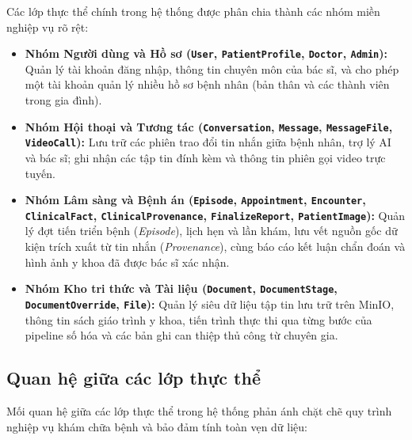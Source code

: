 Các lớp thực thể chính trong hệ thống được phân chia thành các nhóm miền nghiệp vụ rõ rệt:
\begin{itemize}
  \item \textbf{Nhóm Người dùng và Hồ sơ (\texttt{User}, \texttt{PatientProfile}, \texttt{Doctor}, \texttt{Admin}):} Quản lý tài khoản đăng nhập, thông tin chuyên môn của bác sĩ, và cho phép một tài khoản quản lý nhiều hồ sơ bệnh nhân (bản thân và các thành viên trong gia đình).
  \item \textbf{Nhóm Hội thoại và Tương tác (\texttt{Conversation}, \texttt{Message}, \texttt{MessageFile}, \texttt{VideoCall}):} Lưu trữ các phiên trao đổi tin nhắn giữa bệnh nhân, trợ lý AI và bác sĩ; ghi nhận các tập tin đính kèm và thông tin phiên gọi video trực tuyến.
  \item \textbf{Nhóm Lâm sàng và Bệnh án (\texttt{Episode}, \texttt{Appointment}, \texttt{Encounter}, \texttt{ClinicalFact}, \texttt{ClinicalProvenance}, \texttt{FinalizeReport}, \texttt{PatientImage}):} Quản lý đợt tiến triển bệnh (\textit{Episode}), lịch hẹn và lần khám, lưu vết nguồn gốc dữ kiện trích xuất từ tin nhắn (\textit{Provenance}), cùng báo cáo kết luận chẩn đoán và hình ảnh y khoa đã được bác sĩ xác nhận.
  \item \textbf{Nhóm Kho tri thức và Tài liệu (\texttt{Document}, \texttt{DocumentStage}, \texttt{DocumentOverride}, \texttt{File}):} Quản lý siêu dữ liệu tập tin lưu trữ trên MinIO, thông tin sách giáo trình y khoa, tiến trình thực thi qua từng bước của pipeline số hóa và các bản ghi can thiệp thủ công từ chuyên gia.
\end{itemize}

\subsection{Quan hệ giữa các lớp thực thể}

Mối quan hệ giữa các lớp thực thể trong hệ thống phản ánh chặt chẽ quy trình nghiệp vụ khám chữa bệnh và bảo đảm tính toàn vẹn dữ liệu:

